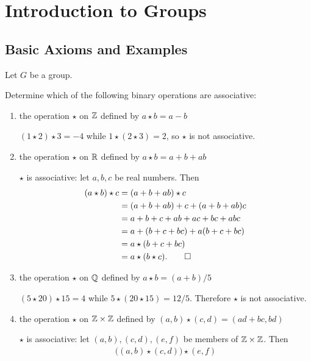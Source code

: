 \chapter{Introduction to Groups}

\section{Basic Axioms and Examples}

Let $G$ be a group.

 Determine which of the following binary operations are
associative:
\begin{enumerate}
\item the operation $\star$ on $\mathbb{Z}$ defined by $a\star b = a - b$
  \begin{solution}
    $(1\star2)\star3 = -4$ while $1\star(2\star3) = 2$, so $\star$ is
    not associative.
  \end{solution}
\item the operation $\star$ on $\mathbb{R}$ defined by $a\star b = a + b + ab$
  \begin{solution}
    $\star$ is associative: let $a,b,c$ be real numbers. Then
    \begin{align*}
      (a\star b)\star c &= (a + b + ab)\star c \\
                        &= (a + b + ab) + c + (a + b + ab)c \\
                        &= a + b + c + ab + ac + bc + abc \\
                        &= a + (b + c + bc) + a(b + c + bc) \\
                        &= a\star(b + c + bc) \\
                        &= a\star(b\star c). \qedhere
    \end{align*}
  \end{solution}
\item the operation $\star$ on $\mathbb{Q}$ defined by $a\star b = (a + b)/5$
  \begin{solution}
    $(5\star20)\star15 = 4$ while $5\star(20\star15) =
    12/5$. Therefore $\star$ is not associative.
  \end{solution}
\item the operation $\star$ on $\mathbb{Z}\times\mathbb{Z}$ defined by
  $(a,b)\star(c,d) = (ad + bc, bd)$
  \begin{solution}
    $\star$ is associative: let $(a,b), (c,d), (e,f)$ be members of
    $\mathbb{Z}\times\mathbb{Z}$. Then
    \begin{align*}
      \big((a,b)\star(c,d)\big)\star(e,f)

\end{align*}
\end{solution}
\end{enumerate}
